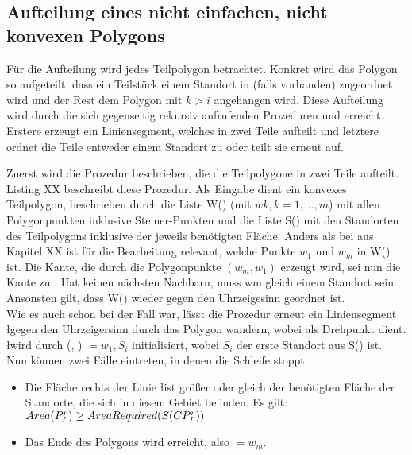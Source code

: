 \documentclass[ngerman]{seminarbeitrag}
\begin{document}
\subsection{Aufteilung eines nicht einfachen, nicht konvexen Polygons}\label{aufteilung nicht konvex}
Für die Aufteilung wird jedes Teilpolygon \cpp betrachtet. Konkret wird das Polygon \pred{\mcpi} so aufgeteilt, dass ein Teilstück einem Standort in \cpi (falls vorhanden) zugeordnet wird und der Rest dem Polygon  mit $k > i$ angehangen wird. Diese Aufteilung wird durch die sich gegenseitig rekursiv aufrufenden Prozeduren \noncon und \daa erreicht. Erstere erzeugt ein Liniensegment, welches \pred{\mcpi} in zwei Teile aufteilt und letztere ordnet die Teile entweder einem Standort zu oder teilt sie erneut auf.

Zuerst wird die Prozedur \noncon beschrieben, die die Teilpolygone in zwei Teile aufteilt. Listing XX beschreibt diese Prozedur.
Als Eingabe dient ein konvexes Teilpolygon, beschrieben durch die Liste W(\cpi) (mit $w{k}, k = 1,…,m$) mit allen Polygonpunkten inklusive Steiner-Punkten und die Liste S(\cpi) mit den Standorten des Teilpolygons inklusive der jeweils benötigten Fläche. Anders als bei \con aus Kapitel XX ist für die Bearbeitung relevant, welche Punkte $w_{1}$ und $w_{m}$ in W(\cpi) ist. Die Kante, die durch die Polygonpunkte $(w_{m}, w_{1})$ erzeugt wird, sei nun die Kante zu . Hat \cpi keinen nächsten Nachbarn, muss wm gleich einem Standort sein. Ansonsten gilt, dass W(\cpi) wieder gegen den Uhrzeigesinn geordnet ist.\\

Wie es auch schon bei \con der Fall war, lässt die Prozedur erneut ein Liniensegment \l gegen den Uhrzeigersinn durch das Polygon \cpi wandern, wobei \ls als Drehpunkt dient. \l wird durch (\ls, \Le) $= w_{1}, S_{i}$ initialisiert, wobei $S_{i}$ der erste Standort aus S(\cpi) ist.\\
Nun können zwei Fälle eintreten, in denen die Schleife stoppt:

\begin{itemize}
\item Die Fläche rechts der Linie \l ist größer oder gleich der benötigten Fläche der Standorte, die sich in diesem Gebiet befinden. Es gilt:
$Area(P_{L}^{r})\ge AreaRequired(S(CP_{L}^{r}))$
\item Das Ende des Polygons wird erreicht, also \Le $= w_{m}$.
\end{itemize}
\end{document}
